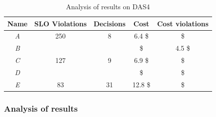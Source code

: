 \begin{table}
  {\scriptsize 
\begin{center}
    \begin{tabular}{  | c | c | c | c | c |}
    \hline
         \textbf{Name}  & \textbf{SLO Violations} & \textbf{Decisions}  & \textbf{Cost}  & \textbf{Cost violations} \\ \hline
   \textit{A}   & 250  &  8 &  6.4 \$ &  \$ \\ \hline   
   \textit{B}  &   &   &   \$ &  4.5 \$ \\ \hline   
   \textit{C}  &  127 &  9 &  6.9 \$ &   \$ \\ \hline   
   \textit{D}  &   &   &   \$ &   \$ \\ \hline   
\textit{E} &  83 & 31 & 12.8 \$ &  \$ \\ \hline   

 \end{tabular}
\end{center}
\vspace{-5mm}
\caption{Analysis of results on DAS4}
\label{summaryDAS4}
}
\end{table}

\subsubsection{Analysis of results}

